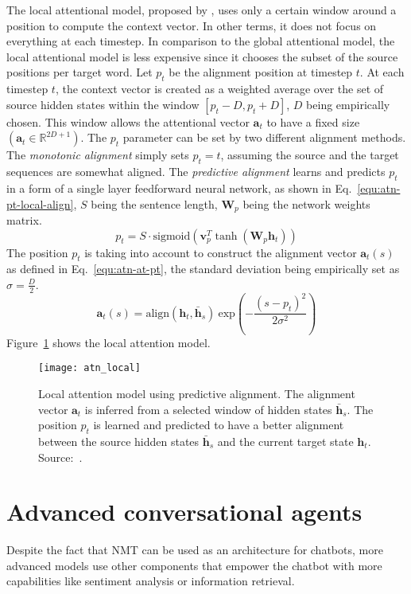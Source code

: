 The local attentional model, proposed by \citet{1508.04025}, uses only a certain window around a position to compute the context vector. In other terms, it does not focus on everything at each timestep. In comparison to the global attentional model, the local attentional model is less expensive since it chooses the subset of the source positions per target word. Let $p_t$ be the alignment position at timestep $t$. At each timestep $t$, the context vector is created as a weighted average over the set of source hidden states within the window $[p_t - D, p_t + D]$, $D$ being empirically chosen.
This window allows the attentional vector $\bm{a}_t$ to have a fixed size $(\bm{a}_t \in \mathbb{R}^{2D+1})$. The $p_t$ parameter can be set by two different alignment methods. The \textit{monotonic alignment} simply sets $p_t = t$, assuming the source and the target sequences are somewhat aligned. The \textit{predictive alignment} learns and predicts $p_t$ in a form of a single layer feedforward neural network, as shown in Eq.~\ref{equ:atn-pt-local-align}, $S$ being the sentence length, $\mathbf{W}_p$ being the network weights matrix.
\begin{equation}
    p_t = S \cdot \mathrm{sigmoid} ( \bm{v}_p^T \tanh ( \mathbf{W}_p \bm{h}_t))
    \label{equ:atn-pt-local-align}
\end{equation}
The position $p_t$ is taking into account to construct the alignment vector $\bm{a}_t(s)$ as defined in Eq.~\ref{equ:atn-at-pt}, the standard deviation being empirically set as $\sigma = \frac{D}{2}$.
\begin{equation}
    \bm{a}_t(s) = \mathrm{align}(\bm{h}_t, \bm{\bar{h}}_s) \ \mathrm{exp}(- \frac{(s - p_t)^2}{2\sigma^2})
    \label{equ:atn-at-pt}
\end{equation}
Figure~\ref{fig:atn-local} shows the local attention model.
\begin{figure}
    \centering
    \texttt{[image: atn\_local]}
    \decoRule
    \caption[Local attention model]{Local attention model using predictive alignment. The alignment vector $\bm{a}_t$ is inferred from a selected window of hidden states $\bm{\bar{h}}_s$. The position $p_t$ is learned and predicted to have a better alignment between the source hidden states $\bm{\bar{h}}_s$ and the current target state $\bm{h}_t$. Source:~\citet{1508.04025}.}
    \label{fig:atn-local}
\end{figure}

\section{Advanced conversational agents}
Despite the fact that NMT can be used as an architecture for chatbots, more advanced models use other components that empower the chatbot with more capabilities like sentiment analysis or information retrieval.

